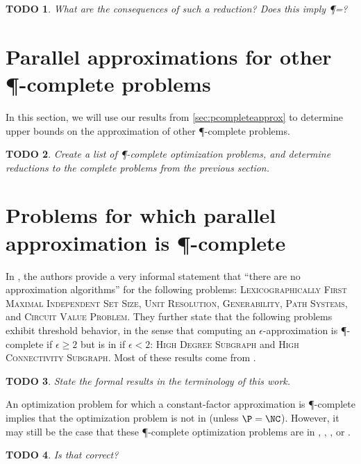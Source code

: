 \documentclass[]{article}
\theoremstyle{plain}
\newtheorem{todo}{TODO}
\theoremstyle{definition}
\begin{document}
\begin{todo}
  What are the consequences of such a reduction?
  Does this imply \P=\NP?
\end{todo}

\section{Parallel approximations for other \texorpdfstring{\P}{P}-complete problems}

In this section, we will use our results from \autoref{sec:pcompleteapprox} to determine upper bounds on the approximation of other \P-complete problems.

\begin{todo}
  Create a list of \P-complete optimization problems, and determine reductions to the complete problems from the previous section.
\end{todo}

\section{Problems for which parallel approximation is \texorpdfstring{\P}{P}-complete}
\label{sec:approximationispcomplete}

In \cite[Section~10.2]{ghr95}, the authors provide a very informal statement that ``there are no \NC{} approximation algorithms'' for the following problems: \textsc{Lexicographically First Maximal Independent Set Size}, \textsc{Unit Resolution}, \textsc{Generability}, \textsc{Path Systems}, and \textsc{Circuit Value Problem}.
They further state that the following problems exhibit threshold behavior, in the sense that computing an $\epsilon$-approximation is \P-complete if $\epsilon\geq 2$ but is in \NCAS{} if $\epsilon<2$: \textsc{High Degree Subgraph} and \textsc{High Connectivity Subgraph}.
Most of these results come from \cite{ss89}.

\begin{todo}
  State the formal results in the terminology of this work.
\end{todo}

An optimization problem for which a constant-factor approximation is \P-complete implies that the optimization problem is not in \ApxNCO{} (unless $\P=\NC$).
However, it may still be the case that these \P-complete optimization problems are in \logApxNCO, \polyApxNCO, \expApxNCO, or \NNCO.

\begin{todo}
  Is that correct?
\end{todo}
\end{document}
